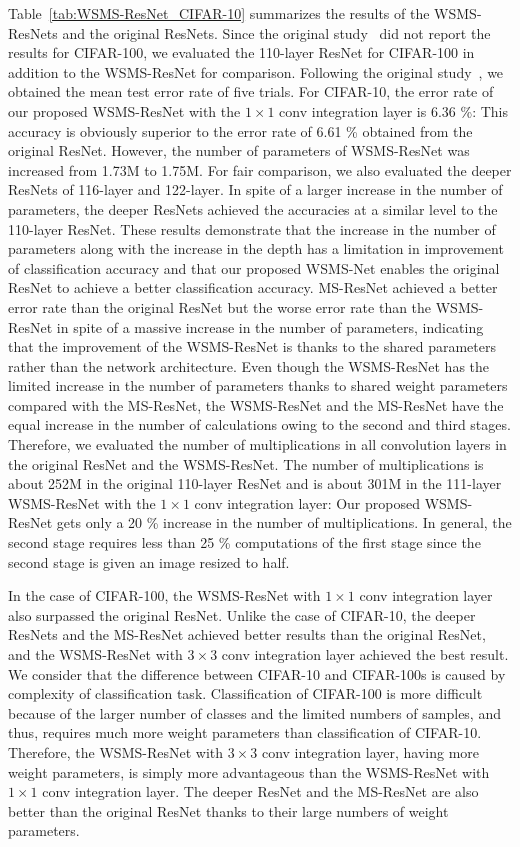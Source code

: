 \documentclass[journal]{IEEEtran}
\begin{document}
Table~\ref{tab:WSMS-ResNet_CIFAR-10} summarizes the results of the WSMS-ResNets and the original ResNets.
Since the original study~\cite{He2017} did not report the results for CIFAR-100, we evaluated the 110-layer ResNet for CIFAR-100 in addition to the WSMS-ResNet for comparison.
Following the original study~\cite{He2017}, we obtained the mean test error rate of five trials.
For CIFAR-10, the error rate of our proposed WSMS-ResNet with the $1\times1$ conv integration layer is 6.36 \%: This accuracy is obviously superior to the error rate of 6.61 \% obtained from the original ResNet.
However, the number of parameters of WSMS-ResNet was increased from 1.73M to 1.75M.
For fair comparison, we also evaluated the deeper ResNets of 116-layer and 122-layer.
In spite of a larger increase in the number of parameters, the deeper ResNets achieved the accuracies at a similar level to the 110-layer ResNet.
These results demonstrate that the increase in the number of parameters along with the increase in the depth has a limitation in improvement of classification accuracy and that our proposed WSMS-Net enables the original ResNet to achieve a better classification accuracy.
MS-ResNet achieved a better error rate than the original ResNet but the worse error rate than the WSMS-ResNet in spite of a massive increase in the number of parameters, indicating that the improvement of the WSMS-ResNet is thanks to the shared parameters rather than the network architecture.
Even though the WSMS-ResNet has the limited increase in the number of parameters thanks to shared weight parameters compared with the MS-ResNet, the WSMS-ResNet and the MS-ResNet have the equal increase in the number of calculations owing to the second and third stages.
Therefore, we evaluated the number of multiplications in all convolution layers in the original ResNet and the WSMS-ResNet.
The number of multiplications is about 252M in the original 110-layer ResNet and is about 301M in the 111-layer WSMS-ResNet with the $1\times1$ conv integration layer: Our proposed WSMS-ResNet gets only a 20 \% increase in the number of multiplications.
In general, the second stage requires less than 25 \% computations of the first stage since the second stage is given an image resized to half.

In the case of CIFAR-100, the WSMS-ResNet with $1\times1$ conv integration layer also surpassed the original ResNet.
Unlike the case of CIFAR-10, the deeper ResNets and the MS-ResNet achieved better results than the original ResNet, and the WSMS-ResNet with $3\times3$ conv integration layer achieved the best result.
We consider that the difference between CIFAR-10 and CIFAR-100s is caused by complexity of classification task.
Classification of CIFAR-100 is more difficult because of the larger number of classes and the limited numbers of samples, and thus, requires much more weight parameters than classification of CIFAR-10.
Therefore, the WSMS-ResNet with $3\times3$ conv integration layer, having more weight parameters, is simply more advantageous than the WSMS-ResNet with $1\times1$ conv integration layer.
The deeper ResNet and the MS-ResNet are also better than the original ResNet thanks to their large numbers of weight parameters.
\end{document}
